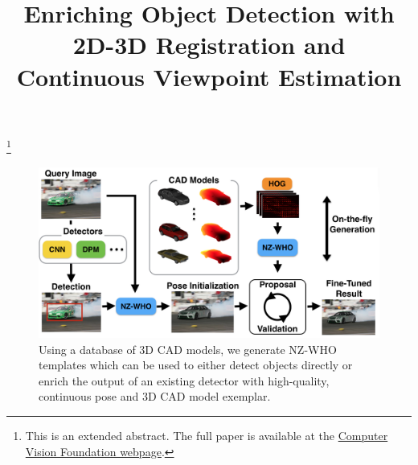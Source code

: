 \documentclass[extendedabs]{bmvc2k}
\begin{document}
\title{Enriching Object Detection with 2D-3D Registration and Continuous Viewpoint Estimation}


\maketitle
\let\thefootnote\relax\footnote{This is an extended abstract. The full paper is available at the \href{http://www.cv-foundation.org/openaccess/CVPR2015.py}{Computer Vision Foundation webpage}. }
\vspace{-0.2in}



\begin{figure}[t]
  \centering
  \includegraphics[width=0.9\linewidth]{front} %
  \caption{Using a database of 3D CAD models, we generate NZ-WHO
    templates which can be used to either detect objects directly or
    enrich the output of an existing detector with high-quality,
    continuous pose and 3D CAD model exemplar.}
  \label{fig:front}
\end{figure}
\vspace{-0.15in}
\end{document}
